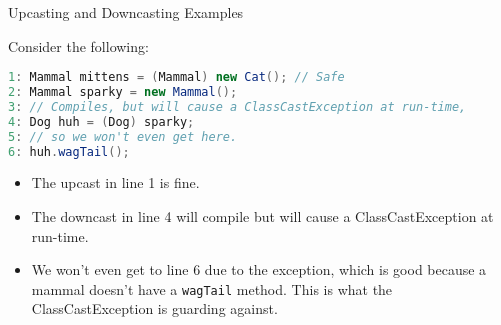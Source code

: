 \documentclass{beamer}
\begin{document}
\begin{frame}[fragile]{Upcasting and Downcasting Examples}


Consider the following:
\begin{lstlisting}[language=Java]
1: Mammal mittens = (Mammal) new Cat(); // Safe
2: Mammal sparky = new Mammal();
3: // Compiles, but will cause a ClassCastException at run-time,
4: Dog huh = (Dog) sparky;
5: // so we won't even get here.
6: huh.wagTail();
\end{lstlisting}

\begin{itemize}
\item The upcast in line 1 is fine.
\item The downcast in line 4 will compile but will cause a ClassCastException at run-time.
\item We won't even get to line 6 due to the exception, which is good because a mammal doesn't have a {\tt wagTail} method.  This is what the ClassCastException is guarding against.
\end{itemize}


\end{frame}







\end{document}

